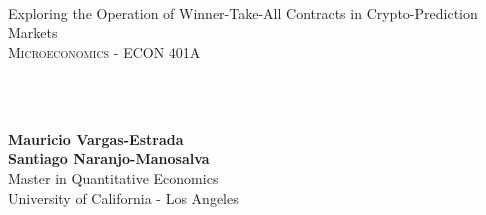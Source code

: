 {
	\parindent0pt
	\ \\ \ \\ \ \\

	\hrulefill
	\vspace{0.0cm}
	\begin{spacing}{2.1}
	{	
		\flushleft
		\fontsize{22pt}{44pt}\selectfont 
		Exploring the Operation of Winner-Take-All Contracts in Crypto-Prediction Markets	
	}\\
	\textsc{Microeconomics - ECON 401A}
	\end{spacing}

	\ \\ \ \\
	{
		\textbf{Mauricio Vargas-Estrada}\\
		\textbf{Santiago Naranjo-Manosalva}\\
		Master in Quantitative Economics\\
		University of California - Los Angeles\par
	}
	\ \\

	\hrulefill

}
